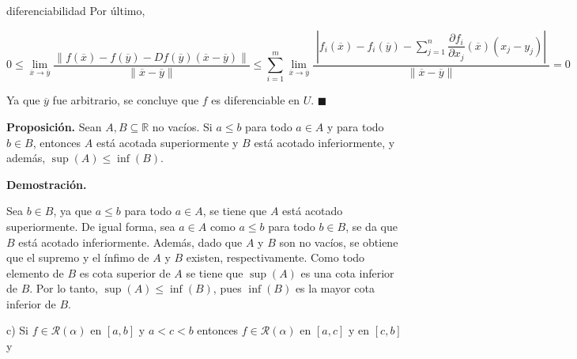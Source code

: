 \documentclass[fleqn, 12pt]{article}
\newenvironment{ejercicio}[1]{\begin{ejer}[breakable, pad at break = 5mm]{}{#1}}{\end{ejer}}
\newcommand{\rsi}[1]{\mathcal{R}(#1)}
\begin{document}
\begin{ejercicio}{diferenciabilidad}
		Por último, 

		\begin{equation*}
			0 \leq \lim_{\overline{x} \to \overline{y}} \dfrac{ \left\lVert f(\overline{x}) - f(\overline{y}) - Df(\overline{y}) \left( \overline{x} - \overline{y} \right) \right\rVert }{ \left\lVert \overline{x} - \overline{y} \right\rVert } \leq \sum_{i=1}^{m} \lim_{\overline{x} \to \overline{y}} \dfrac{ \phantom{|} \left\lvert f_i(\overline{x}) - f_i(\overline{y}) - \displaystyle \sum_{j=1}^{n} \dfrac{\partial f_i}{\partial x_j} (\overline{x}) \left( x_j - y_j \right) \right\rvert \phantom{|}}{ \left\lVert \overline{x} - \overline{y} \right\rVert } = 0
		\end{equation*}

		Ya que $ \overline{y} $ fue arbitrario, se concluye que $ f $ es diferenciable en $ U $. \hfill $ \blacksquare $ \\
	\end{ejercicio}

	


	\newpage

	\textbf{Proposición.} Sean $ A, B \subseteq \mathbb{R} $ no vacíos. Si $ a \leq b $ para todo $ a \in A $ y para todo $ b \in B $, entonces $ A $ está acotada superiormente y $ B $ está acotado inferiormente, y además, $ \sup (A) \leq \inf (B) $.

	\textbf{Demostración.} 

	Sea $ b \in B $, ya que $ a \leq b $ para todo $ a \in A $, se tiene que $ A $ está acotado superiormente. De igual forma, sea $ a \in A $ como $ a \leq b $ para todo $ b \in B $, se da que $ B $ está acotado inferiormente. Además, dado que $ A $ y $ B $ son no vacíos, se obtiene que el supremo y el ínfimo de $ A $ y $ B $ existen, respectivamente. Como todo elemento de $ B $ es cota superior de $ A $ se tiene que $ \sup (A) $ es una cota inferior de $ B $. Por lo tanto, $ \sup (A) \leq \inf (B) $, pues $ \inf(B) $ es la mayor cota inferior de $ B $.


	\newpage

	c) Si $ f \in \rsi{\alpha} $ en $ [a,b] $ y $ a < c < b $ entonces $ f \in \rsi{\alpha} $ en $ [a,c] $ y en $ [c,b] $ y
\end{document}
